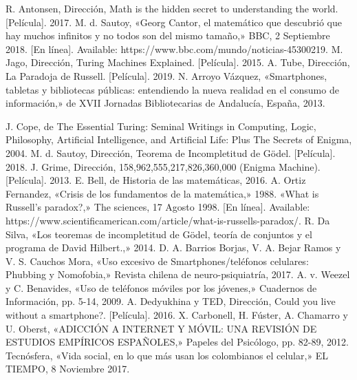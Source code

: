 \documentclass[letterpaper, 12 pt, conference]{ieeeconf}  %
\begin{document}
\begin{thebibliography}{99}

 R. Antonsen, Dirección, Math is the hidden secret to understanding the world. [Película]. 2017. 
 M. d. Sautoy, «Georg Cantor, el matemático que descubrió que hay muchos infinitos y no todos son del mismo tamaño,» BBC, 2 Septiembre 2018. [En línea]. Available: https://www.bbc.com/mundo/noticias-45300219.
 M. Jago, Dirección, Turing Machines Explained. [Película]. 2015.
 A. Tube, Dirección, La Paradoja de Russell. [Película]. 2019.
 N. Arroyo Vázquez, «Smartphones, tabletas y bibliotecas públicas: entendiendo la nueva realidad en el consumo de información,» de XVII Jornadas Bibliotecarias de Andalucía, España, 2013.

 J. Cope, de The Essential Turing: Seminal Writings in Computing, Logic, Philosophy, Artificial Intelligence, and Artificial Life: Plus The Secrets of Enigma, 2004.
 M. d. Sautoy, Dirección, Teorema de Incompletitud de Gödel. [Película]. 2018.
 J. Grime, Dirección, 158,962,555,217,826,360,000 (Enigma Machine). [Película]. 2013.
 E. Bell, de Historia de las matemáticas, 2016.
 A. Ortiz Fernandez, «Crisis de los fundamentos de la matemática,» 1988.
 «What is Russell's paradox?,» The sciences, 17 Agosto 1998. [En línea]. Available: https://www.scientificamerican.com/article/what-is-russells-paradox/.
 R. Da Silva, «Los teoremas de incompletitud de Gödel, teoría de conjuntos y el programa de David Hilbert.,» 2014. 
 D. A. Barrios Borjas, V. A. Bejar Ramos y V. S. Cauchos Mora, «Uso excesivo de Smartphones/teléfonos celulares: Phubbing y Nomofobia,» Revista chilena de neuro-psiquiatría, 2017. 
 A. v. Weezel y C. Benavides, «Uso de teléfonos móviles por los jóvenes,» Cuadernos de Información, pp. 5-14, 2009. 
 A. Dedyukhina y TED, Dirección, Could you live without a smartphone?. [Película]. 2016.
 X. Carbonell, H. Fúster, A. Chamarro y U. Oberst, «ADICCIÓN A INTERNET Y MÓVIL: UNA REVISIÓN DE ESTUDIOS EMPÍRICOS ESPAÑOLES,» Papeles del Psicólogo, pp. 82-89, 2012.
 Tecnósfera, «Vida social, en lo que más usan los colombianos el celular,» EL TIEMPO, 8 Noviembre 2017.

\end{thebibliography}
\end{document}
